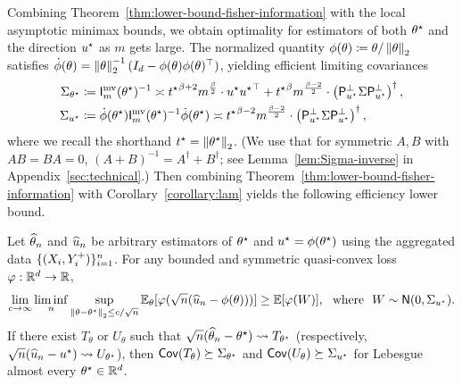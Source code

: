 Combining Theorem~\ref{thm:lower-bound-fisher-information}
with the local asymptotic minimax bounds, we obtain
optimality for estimators of both $\theta^\star$ and the direction
$u^\star$ as $m$ gets large.
The normalized quantity $\phi(\theta) \coloneqq \theta / \left\|{\theta}\right\|_2$ satisfies $\dot{\phi}(\theta) = \left\|{\theta}\right\|_2^{-1}
(I_d - \phi(\theta) \phi(\theta)^\top)$, yielding
efficient limiting covariances
\begin{align*}
  \Sigma_{\theta^\star} & \coloneqq
  \mathsf{I}^{\textup{mv}}_m(\theta^\star)^{-1}  \asymp {t^\star}^{\beta +2} m^{\frac{\beta}{2}} \cdot u^\star {u^\star}^\top +  {t^\star}^{\beta}m^{\frac{\beta-2}{2}}  \cdot \left({\mathsf{P}_{u^\star}^\perp \Sigma \mathsf{P}_{u^\star}^\perp}\right)^\dagger, \\
  \Sigma_{u^\star} & \coloneqq \dot{\phi}(\theta^\star)
  \mathsf{I}^{\textup{mv}}_m(\theta^\star)^{-1} \dot{\phi}(\theta^\star)
  \asymp {t^\star}^{\beta-2 }m^{\frac{\beta-2}{2}}  \cdot \left({\mathsf{P}_{u^\star}^\perp \Sigma \mathsf{P}_{u^\star}^\perp}\right)^\dagger,
\end{align*}
where we recall the shorthand $t^\star = \left\|{\theta^\star}\right\|_2$.
%
(We use that for symmetric $A, B$ with $AB = BA = 0$,
$(A + B)^{-1} = A^\dagger + B^\dagger$; see Lemma~\ref{lem:Sigma-inverse}
in Appendix~\ref{sec:technical}.)
%
Then combining Theorem~\ref{thm:lower-bound-fisher-information} with
Corollary~\ref{corollary:lam} yields the following efficiency
lower bound.
\begin{corollary} \label{cor:LAM-lower-bounds}
  Let $\widehat{\theta}_n$ and $\widehat{u}_n$
  be arbitrary estimators of $\theta^\star$ and $u^\star = \phi(\theta^\star)$
  using the aggregated data $\{(X_i,
  Y^+_i)\}_{i=1}^n$.
  For any bounded and symmetric quasi-convex loss $\varphi : \mathbb{R}^d \to \mathbb{R}$,
  \begin{equation*}
    \lim_{c \to \infty}
    \liminf_n \sup_{\left\|{\theta - \theta^\star}\right\|_2 \le c/\sqrt{n}}
    \mathbb{E}_\theta[\varphi(\sqrt{n}(\widehat{u}_n - \phi(\theta)))]
    \ge \mathbb{E}[\varphi(W)],
    ~~ \mbox{where} ~~
    W \sim \mathsf{N}(0, \Sigma_{u^\star}).
  \end{equation*}
  If there exist
  $T_\theta$ or $U_\theta$
  such that $\sqrt{n}(\widehat{\theta}_n - \theta^\star) \rightsquigarrow T_{\theta^\star}$
  (respectively, $\sqrt{n}(\widehat{u}_n - u^\star) \rightsquigarrow U_{\theta^\star}$),
  then
  $\mathsf{Cov}(T_\theta) \succeq \Sigma_{\theta^\star}$ and $\mathsf{Cov}(U_\theta) \succeq
  \Sigma_{u^\star}$ for Lebesgue almost every $\theta^\star \in \mathbb{R}^d$.
\end{corollary}



